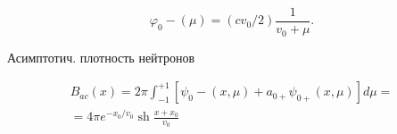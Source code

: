 \documentclass[10pt]{article}
\begin{document}
\[

\varphi_{0}-(\mu)=\left(c v_{0} / 2\right) \frac{1}{v_{0}+\mu} .

\]



Асимптотич. плотность нейтронов



\[

\begin{gathered}

B_{a c}(x)=2 \pi \int_{-1}^{+1}\left[\psi_{0}-(x, \mu)+a_{0+} \psi_{0+}(x, \mu)\right] d \mu= \\

=4 \pi e^{-x_{0} / v_{0}} \operatorname{sh} \frac{x+x_{0}}{v_{0}}

\end{gathered}

\]
\end{document}
